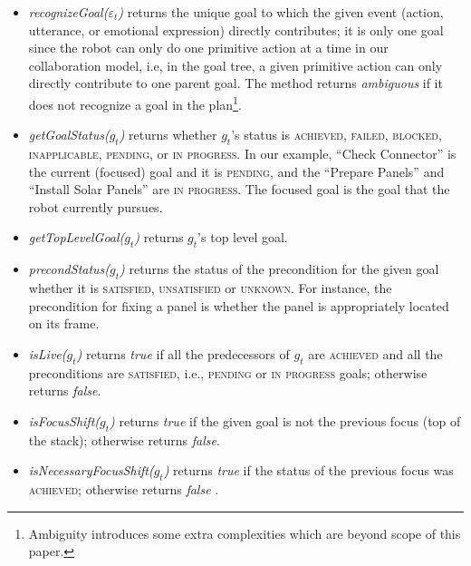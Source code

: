 \begin{itemize}[leftmargin=2pt]
  \setlength\itemsep{1mm}
  \item \textit{recognizeGoal($\varepsilon_t$)} returns the unique goal to which
  the given event (action, utterance, or emotional expression) directly
  contributes; it is only one goal since the robot can only do one primitive
  action at a time in our collaboration model, i.e, in the goal tree, a given
  primitive action can only directly contribute to one parent goal. The method
  returns \textit{ambiguous} if it does not recognize a goal in the
  plan\footnote{Ambiguity introduces some extra complexities which are beyond
  scope of this paper.}.
  
  \item \textit{getGoalStatus($g_t$)} returns whether $g_t$'s status is
  \textsc{achieved, failed, blocked, inapplicable, pending,} or \textsc{in
  progress}. In our example, ``Check Connector'' is the current (focused) goal
  and it is \textsc{pending}, and the ``Prepare Panels'' and ``Install Solar
  Panels'' are \textsc{in progress}. The focused goal is the goal that the robot
  currently pursues.
  
  \item \textit{getTopLevelGoal($g_t$)} returns $g_t$'s top level goal.

  \item \textit{precondStatus($g_t$)} returns the status of the precondition for
  the given goal whether it is \textsc{satisfied, unsatisfied} or
  \textsc{unknown}. For instance, the precondition for fixing a panel is whether
  the panel is appropriately located on its frame.
  
  \item \textit{isLive($g_t$)} returns \textit{true} if all the predecessors of
  $g_t$ are \textsc{achieved} and all the preconditions are \textsc{satisfied},
  i.e., \textsc{pending} or \textsc{in progress} goals; otherwise returns
  \textit{false}.
  
  \item \textit{isFocusShift($g_t$)} returns \textit{true} if the given
  goal is not the previous focus (top of the stack); otherwise returns
  \textit{false}.
  
  \item \textit{isNecessaryFocusShift($g_t$)} returns \textit{true} if the
  status of the previous focus was \textsc{achieved}; otherwise returns
  \textit{false} \cite{rich:focused-unfocused-users}.
  

\end{itemize}
